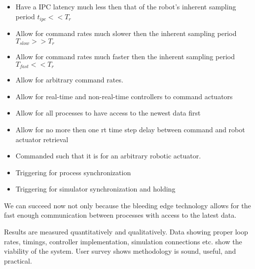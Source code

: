\begin{itemize}
\item Have a IPC latency much less then that of the robot's inherent sampling period $t_{ipc}<<T_{r}$
\item Allow for command rates much slower then the inherent sampling period $T_{slow}>>T_{r}$
\item Allow for command rates much faster then the inherent sampling period $T_{fast}<<T_{r}$
\item Allow for arbitrary command rates.
\item Allow for real-time and non-real-time controllers to command actuators
\item Allow for all processes to have access to the newest data first
\item Allow for no more then one rt time step delay between command and robot actuator retrieval
\item Commanded such that it is for an arbitrary robotic actuator.
\item Triggering for process synchronization
\item Triggering for simulator synchronization and holding
\end{itemize}
We can succeed now not only because the bleeding edge technology allows for the fast enough communication between processes with access to the latest data.

Results are measured quantitatively and qualitatively.
Data showing proper loop rates, timings, controller implementation, simulation connections etc. show the viability of the system.
User survey shows methodology is sound, useful, and practical.



